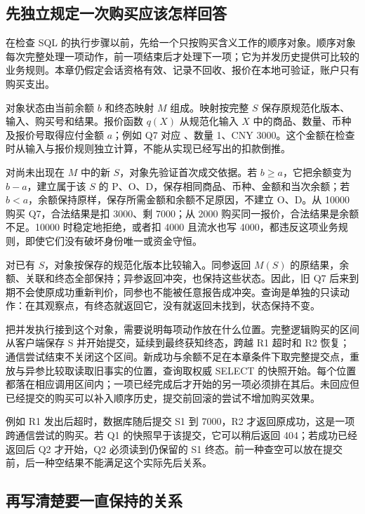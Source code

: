 \subsection*{先独立规定一次购买应该怎样回答}

在检查 SQL 的执行步骤以前，先给一个只按购买含义工作的顺序对象。顺序对象每次完整处理一项动作，前一项结束后才处理下一项；它为并发历史提供可比较的业务规则。本章仍假定会话资格有效、记录不回收、报价在本地可验证，账户只有购买支出。

对象状态由当前余额 \(b\) 和终态映射 \(M\) 组成。映射按完整 \(S\) 保存原规范化版本、输入、购买号和结果。报价函数 \(q(X)\) 从规范化输入 \(X\) 中的商品、数量、币种及报价号取得应付金额 \(a\)；例如 Q7 对应 、数量 1、CNY 3000。这个金额在检查时从输入与报价规则独立计算，不能从实现已经写出的扣款倒推。

对尚未出现在 \(M\) 中的新 \(S\)，对象先验证首次成交依据。若 \(b\geq a\)，它把余额变为 \(b-a\)，建立属于该 \(S\) 的 P、O、D，保存相同商品、币种、金额和当次余额；若 \(b<a\)，余额保持原样，保存所需金额和余额不足原因，不建立 O、D。从 10000 购买 Q7，合法结果是扣 3000、剩 7000；从 2000 购买同一报价，合法结果是余额不足。10000 时稳定地拒绝，或者扣 4000 且流水也写 4000，都违反这项业务规则，即使它们没有破坏身份唯一或资金守恒。

对已有 \(S\)，对象按保存的规范化版本比较输入。同参返回 \(M(S)\) 的原结果，余额、关联和终态全部保持；异参返回冲突，也保持这些状态。因此，旧 Q7 后来到期不会使原成功重新判价，同参也不能被任意报告成冲突。查询是单独的只读动作：在其观察点，有终态就返回它，没有就返回未找到，状态保持不变。



把并发执行接到这个对象，需要说明每项动作放在什么位置。完整逻辑购买的区间从客户端保存 S 并开始提交，延续到最终获知终态，跨越 R1 超时和 R2 恢复；通信尝试结束不关闭这个区间。新成功与余额不足在本章条件下取完整提交点，重放与异参比较取读取旧事实的位置，查询取权威 SELECT 的快照开始。每个位置都落在相应调用区间内；一项已经完成后才开始的另一项必须排在其后。未回应但已经提交的购买可以补入顺序历史，提交前回滚的尝试不增加购买效果。

例如 R1 发出后超时，数据库随后提交 S1 到 7000，R2 才返回原成功，这是一项跨通信尝试的购买。若 Q1 的快照早于该提交，它可以稍后返回 404；若成功已经返回后 Q2 才开始，Q2 必须读到仍保留的 S1 终态。前一种查空可以放在提交前，后一种空结果不能满足这个实际先后关系。

\subsection*{再写清楚要一直保持的关系}


